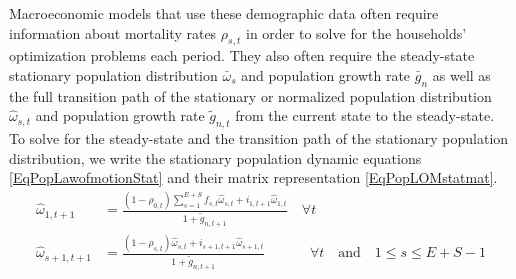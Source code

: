 \documentclass[letterpaper,12pt]{article}
\theoremstyle{definition}
\begin{document}
    Macroeconomic models that use these demographic data often require information about mortality rates $\rho_{s,t}$ in order to solve for the households' optimization problems each period. They also often require the steady-state stationary population distribution $\bar{\omega}_{s}$ and population growth rate $\bar{g}_n$ as well as the full transition path of the stationary or normalized population distribution $\hat{\omega}_{s,t}$ and population growth rate $\tilde{g}_{n,t}$ from the current state to the steady-state. To solve for the steady-state and the transition path of the stationary population distribution, we write the stationary population dynamic equations \eqref{EqPopLawofmotionStat} and their matrix representation \eqref{EqPopLOMstatmat}.
    \begin{equation}\label{EqPopLawofmotionStat}
      \begin{split}
        \hat{\omega}_{1,t+1} &= \frac{(1-\rho_{0,t})\sum_{s=1}^{E+S}f_{s,t}\hat{\omega}_{s,t} + i_{1,t+1}\hat{\omega}_{1,t}}{1+\tilde{g}_{n,t+1}}\quad\forall t \\
        \hat{\omega}_{s+1,t+1} &= \frac{(1 - \rho_{s,t})\hat{\omega}_{s,t} + i_{s+1,t+1}\hat{\omega}_{s+1,t}}{1+\tilde{g}_{n,t+1}}\qquad\quad\:\forall t\quad\text{and}\quad 1\leq s \leq E+S-1
      \end{split}
    \end{equation}
\end{document}
